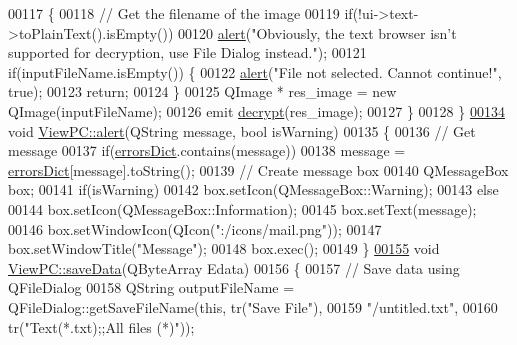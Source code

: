 \begin{DoxyCode}
00117     \{
00118         \textcolor{comment}{// Get the filename of the image}
00119         \textcolor{keywordflow}{if}(!ui->text->toPlainText().isEmpty())
00120             \mbox{\hyperlink{class_view_p_c_a7c467169467789561078abc9d4fe57bd}{alert}}(\textcolor{stringliteral}{"Obviously, the text browser isn't supported for decryption, use File Dialog
       instead."});
00121         \textcolor{keywordflow}{if}(inputFileName.isEmpty()) \{
00122             \mbox{\hyperlink{class_view_p_c_a7c467169467789561078abc9d4fe57bd}{alert}}(\textcolor{stringliteral}{"File not selected. Cannot continue!"}, \textcolor{keyword}{true});
00123             \textcolor{keywordflow}{return};
00124         \}
00125         QImage * res\_image = \textcolor{keyword}{new} QImage(inputFileName);
00126         emit \mbox{\hyperlink{class_view_p_c_acf8feb98f757cc238dada1df2308e303}{decrypt}}(res\_image);
00127     \}
00128 \}
\mbox{\hyperlink{class_view_p_c_a7c467169467789561078abc9d4fe57bd}{00134}} \textcolor{keywordtype}{void} \mbox{\hyperlink{class_view_p_c_a7c467169467789561078abc9d4fe57bd}{ViewPC::alert}}(QString message, \textcolor{keywordtype}{bool} isWarning)
00135 \{
00136     \textcolor{comment}{// Get message}
00137     \textcolor{keywordflow}{if}(\mbox{\hyperlink{class_view_p_c_a26f90436aca32e5bad46f5e69a7e7e09}{errorsDict}}.contains(message))
00138         message = \mbox{\hyperlink{class_view_p_c_a26f90436aca32e5bad46f5e69a7e7e09}{errorsDict}}[message].toString();
00139     \textcolor{comment}{// Create message box}
00140     QMessageBox box;
00141     \textcolor{keywordflow}{if}(isWarning)
00142         box.setIcon(QMessageBox::Warning);
00143     \textcolor{keywordflow}{else}
00144         box.setIcon(QMessageBox::Information);
00145     box.setText(message);
00146     box.setWindowIcon(QIcon(\textcolor{stringliteral}{":/icons/mail.png"}));
00147     box.setWindowTitle(\textcolor{stringliteral}{"Message"});
00148     box.exec();
00149 \}
\mbox{\hyperlink{class_view_p_c_aaff156103970be7c777beedaf0020604}{00155}} \textcolor{keywordtype}{void} \mbox{\hyperlink{class_view_p_c_aaff156103970be7c777beedaf0020604}{ViewPC::saveData}}(QByteArray Edata)
00156 \{
00157     \textcolor{comment}{// Save data using QFileDialog}
00158     QString outputFileName = QFileDialog::getSaveFileName(\textcolor{keyword}{this}, tr(\textcolor{stringliteral}{"Save File"}),
00159                                \textcolor{stringliteral}{"/untitled.txt"},
00160                                tr(\textcolor{stringliteral}{"Text(*.txt);;All files (*)"}));

\end{DoxyCode}
